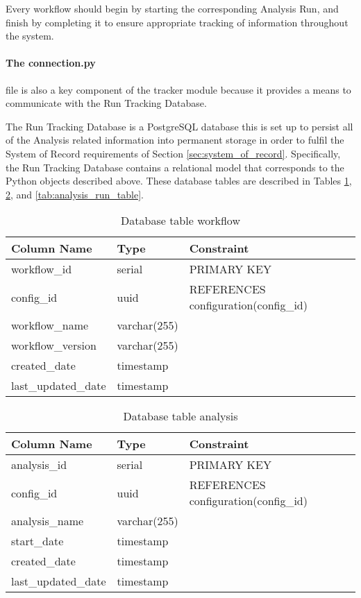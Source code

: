 Every workflow should begin by starting the corresponding Analysis Run, and finish by completing it to ensure appropriate tracking of information throughout the system.

\paragraph{The connection.py} file is also a key component of the tracker module because it provides a means to communicate with the Run Tracking Database.

The Run Tracking Database is a PostgreSQL database this is set up to persist all of the Analysis related information into permanent storage in order to fulfil the System of Record requirements of Section \ref{sec:system_of_record}. Specifically, the Run Tracking Database contains a relational model that corresponds to the Python objects described above. These database tables are described in Tables \ref{tab:workflow_table}, \ref{tab:analysis_table}, and \ref{tab:analysis_run_table}.

\begin{table}[h!]
\renewcommand{\arraystretch}{1.2} 
\centering
\begin{tabular}{@{}lll@{}}
\toprule
Column Name & Type & Constraint\\
\midrule
workflow\_id & serial & PRIMARY KEY\\
config\_id & uuid & REFERENCES configuration(config\_id)\\
workflow\_name & varchar(255) & \\
workflow\_version & varchar(255) & \\
created\_date & timestamp\\
last\_updated\_date & timestamp\\
\bottomrule
\end{tabular}
\caption{Database table workflow}
\label{tab:workflow_table}
\end{table}

\begin{table}[h!]
\renewcommand{\arraystretch}{1.2} 
\centering
\begin{tabular}{@{}lll@{}}
\toprule
Column Name & Type & Constraint\\
\midrule
analysis\_id & serial & PRIMARY KEY\\
config\_id & uuid & REFERENCES configuration(config\_id)\\
analysis\_name & varchar(255) & \\
start\_date & timestamp & \\
created\_date & timestamp\\
last\_updated\_date & timestamp\\
\bottomrule
\end{tabular}
\caption{Database table analysis}
\label{tab:analysis_table}
\end{table}


